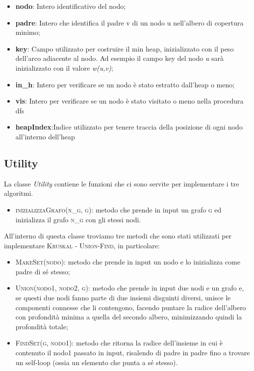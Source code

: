 \begin{itemize}
    \item \textbf{nodo}: Intero identificativo del nodo;
    \item \textbf{padre}: Intero che identifica il padre v di un nodo u nell'albero di copertura minimo;
    \item \textbf{key}: Campo utilizzato per costruire il min heap, inizializzato con il peso dell'arco adiacente al nodo. Ad esempio il campo key del nodo \emph{u} sarà inizializzato con il valore \emph{w(u,v)};
    \item \textbf{in\_h}: Intero per verificare se un nodo è stato estratto dall'heap o meno;
    \item \textbf{vis}: Intero per verificare se un nodo è stato visitato o meno nella procedura dfs
    \item \textbf{heapIndex}:Indice utilizzato per tenere traccia della posizione di ogni nodo all'interno dell'heap
\end{itemize}

\subsection{Utility}
\label{Utility}

La classe \textit{Utility} contiene le funzioni che ci sono servite per implementare i tre algoritmi. 

\begin{itemize}
    \item \textsc{inizializzaGrafo(n\_g, g)}: metodo che prende in input un grafo \textsc{g} ed inizializza il grafo \textsc{n\_g} con gli stessi nodi.
\end{itemize} 

All'interno di questa classe troviamo tre metodi che sono stati utilizzati per implementare \textsc{Kruskal - Union-Find}, in particolare:
\begin{itemize}
    \item \textsc{MakeSet(nodo)}: metodo che prende in input un nodo e lo inizializza come padre di sé stesso;
    \item \textsc{Union(nodo1, nodo2, g)}: metodo che prende in input due nodi e un grafo e, se questi due nodi fanno parte di due insiemi disguinti diversi, unisce le componenti connesse che li contengono, facendo puntare la radice dell'albero con profondità minima a quella del secondo albero, minimizzando quindi la profondità totale;
    \item \textsc{FindSet(g, nodo1)}: metodo che ritorna la radice dell'insieme in cui è contenuto il nodo1 passato in input, risalendo di padre in padre fino a trovare un self-loop (ossia un elemento che punta a sé stesso). 
\end{itemize}

